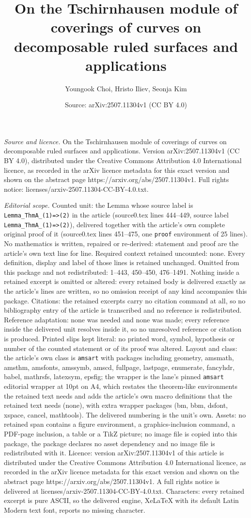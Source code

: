 \documentclass[10pt,a4paper]{amsart}
\title[On the Tschirnhausen module of coverings of curves on decomp]{On the Tschirnhausen module of coverings of curves on decomposable ruled surfaces and applications}
\author{Youngook Choi, Hristo Iliev, Seonja Kim}
\date{Source: arXiv:2507.11304v1 (CC BY 4.0)}
\begin{document}
\maketitle

\noindent\emph{Source and licence.} On the Tschirnhausen module of coverings of curves on decomposable ruled surfaces and applications. Version arXiv:2507.11304v1 (CC BY 4.0), distributed under the Creative Commons Attribution 4.0 International licence, as recorded in the arXiv licence metadata for this exact version and shown on the abstract page https://arxiv.org/abs/2507.11304v1. Full rights notice: licenses/arxiv-2507.11304-CC-BY-4.0.txt.\par\smallskip

\noindent\textit{Editorial scope.} Counted unit: the Lemma whose source label is \texttt{Lemma\_ThmA\_(1)=>(2)} in the article (source0.tex lines 444--449, source label \texttt{Lemma\_ThmA\_(1)=>(2)}), delivered together with the article's own complete original proof of it (source0.tex lines 451--475, one \texttt{proof} environment of 25 lines). No mathematics is written, repaired or re-derived: statement and proof are the article's own text line for line. Required context retained uncounted: none. Every definition, display and label of those lines is retained unchanged. Omitted from this package and not redistributed: 1--443, 450--450, 476--1491. Nothing inside a retained excerpt is omitted or altered: every retained body is delivered exactly as the article's lines are written, so no omission receipt of any kind accompanies this package. Citations: the retained excerpts carry no citation command at all, so no bibliography entry of the article is transcribed and no reference is redistributed. Reference adaptation: none was needed and none was made; every reference inside the delivered unit resolves inside it, so no unresolved reference or citation is produced. Printed slips kept literal: no printed word, symbol, hypothesis or number of the counted statement or of its proof was altered. Layout and class: the article's own class is \texttt{amsart} with packages including geometry, amsmath, amsthm, amsfonts, amssymb, amscd, fullpage, lastpage, enumerate, fancyhdr, babel, mathrsfs, latexsym, epsfig; the wrapper is the lane's pinned \texttt{amsart} editorial wrapper at 10pt on A4, which restates the theorem-like environments the retained text needs and adds the article's own macro definitions that the retained text needs (none), with extra wrapper packages (bm, bbm, dsfont, xspace, cancel, mathtools). The delivered numbering is the unit's own. Assets: no retained span contains a figure environment, a graphics-inclusion command, a PDF-page inclusion, a table or a TikZ picture; no image file is copied into this package, the package declares no asset dependency and no image file is redistributed with it. Licence: version arXiv:2507.11304v1 of this article is distributed under the Creative Commons Attribution 4.0 International licence, as recorded in the arXiv licence metadata for this exact version and shown on the abstract page https://arxiv.org/abs/2507.11304v1. A full rights notice is delivered at licenses/arxiv-2507.11304-CC-BY-4.0.txt. Characters: every retained excerpt is pure ASCII, so the delivered engine, XeLaTeX with its default Latin Modern text font, reports no missing character.
\end{document}
